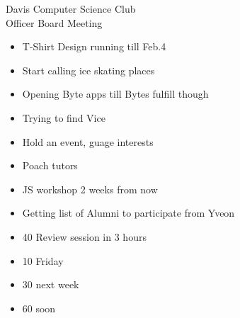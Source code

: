 \documentclass{article}
\begin{document}
\begin{Minutes}{Davis Computer Science Club\\Officer Board Meeting}




\maketitle

\begin{itemize}
    \item T-Shirt Design running till Feb.4
\end{itemize}

\begin {itemize}
    \item Start calling ice skating places
    \item Opening Byte apps till Bytes fulfill though
\end {itemize}


\begin {itemize} 
    \item Trying to find Vice
    \item Hold an event, guage interests
    \item Poach tutors
    \item JS workshop 2 weeks from now
\end {itemize}

\begin {itemize}
    \item Getting list of Alumni to participate from Yveon
\end {itemize}

\begin{itemize}
    \item 40 Review session in 3 hours
    \item 10 Friday
    \item 30 next week
    \item 60 soon
\end {itemize}


\end{Minutes}
\end{document}
